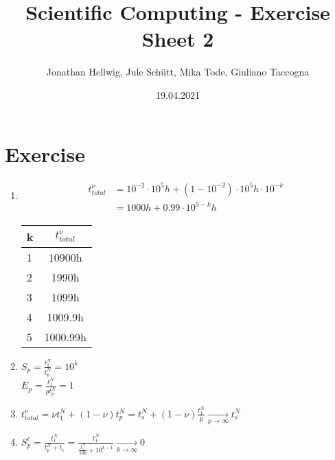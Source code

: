 \documentclass{article}
\title{Scientific Computing - Exercise Sheet 2}
\author{Jonathan Hellwig, Jule Schütt, Mika Tode, Giuliano Taccogna}
\date{19.04.2021}
\begin{document}
\maketitle

\section{Exercise}
\begin{enumerate}[label=(\alph*)]
  \item 
    \begin{align*}
      t^{\nu}_{total} &= 10^{-2} \cdot 10^5h + (1 - 10^{-2}) \cdot 10^5h\cdot 10^{-k} \\
                      &= 1000h + 0.99 \cdot 10^{5-k}h
    \end{align*}
    \begin{tabular}{ l | c } 
  k & $t^{\nu}_{total}$ \\
  \hline
  1 & 10900h \\
  2 & 1990h  \\
  3 & 1099h  \\
  4 & 1009.9h  \\
  5 & 1000.99h  \\
\end{tabular}
\item $S_p = \frac{t_1^N}{t_p^N} = 10^k$ \\
  $E_p = \frac{t_1^N}{pt_p^N} = 1$
\item $t^{\nu}_{total} = \nu t_1^N + (1-\nu)t_p^N = t_s^N + (1-\nu)\frac{t_1^N}{p} \xrightarrow[p \to \infty]{} t_s^N$
\item $S^c_p = \frac{t_1^N}{t_p^N+t_c} = \frac{t_1^N}{\frac{t_1^N}{10k} + 10^{k-1}} \xrightarrow[k \to \infty]{} 0$
\end{enumerate}
\end{document}
